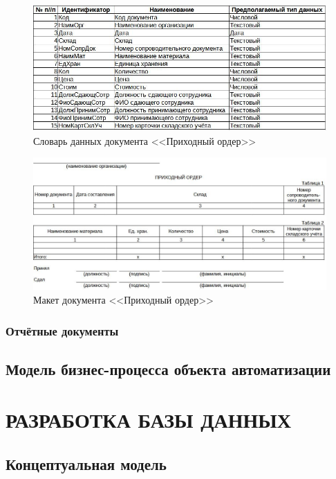\documentclass[12pt, a4paper, simple]{eskdtext}
\begin{document}
    \begin{figure}[p!h]
        \centering
        \includegraphics[]
            {_docs/ОД_ПрихОрд_типы.jpg}
        \caption{Словарь данных документа <<Приходный ордер>>}
        \label{fig:od_PrihOrd_tipi}
    \end{figure}

    \begin{figure}[p!h]
        \centering
        \includegraphics[width=16cm]
            {_docs/ОД_ПрихОрд_макет.jpg}
        \caption{Макет документа <<Приходный ордер>>}
        \label{fig:od_PrihOrd_maket}
    \end{figure}

    \subsubsection{Отчётные документы}

    \subsection{Модель бизнес-процесса объекта автоматизации}
    \newpage

    \section{РАЗРАБОТКА БАЗЫ ДАННЫХ}
    \subsection{Концептуальная модель}
\end{document}
